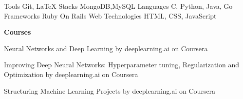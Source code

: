 



  \begin{cvskills}
  \cvskill
    {Tools}
    {Git, LaTeX} 
  \cvskill
    {Stacks}
    {MongoDB,MySQL}
  \cvskill
      {Languages}
      {C, Python, Java, Go}
  \cvskill
    {Frameworks}
    {Ruby On Rails}
  \cvskill
    {Web Technologies}
    {HTML, CSS, JavaScript}
    

  \end{cvskills}


  \begin{cventries}

 \cventry
 {\bf Courses}
 {}
 {}
 {}
    {
      \begin{cvitems} %
        \item {Neural Networks and Deep Learning by deeplearning.ai on Coursera}
        \item {Improving Deep Neural Networks: Hyperparameter tuning, Regularization and Optimization by deeplearning.ai on Coursera}
        \item {Structuring Machine Learning Projects by deeplearning.ai on Coursera}
      \end{cvitems}
    }
\end{cventries}